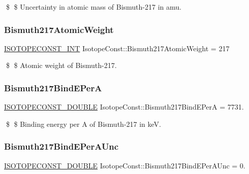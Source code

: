 \$ \$ Uncertainty in atomic mass of Bismuth-\/217 in amu. \mbox{\label{group___isotope_const-_bismuth-_bi217_ga1aa78d8ddf62b6e94b893dd92f1106c9}} 
\subsubsection{\texorpdfstring{Bismuth217\+Atomic\+Weight}{Bismuth217AtomicWeight}}
{\footnotesize\ttfamily \mbox{\hyperlink{group___isotope_const-_macros_ga5f18360b3e99483a35c32d789e62621c}{I\+S\+O\+T\+O\+P\+E\+C\+O\+N\+S\+T\+\_\+\+I\+NT}} Isotope\+Const\+::\+Bismuth217\+Atomic\+Weight = 217}

\$ \$ Atomic weight of Bismuth-\/217. \mbox{\label{group___isotope_const-_bismuth-_bi217_ga7b9d72799d45cb617e8bf26211e88613}} 
\subsubsection{\texorpdfstring{Bismuth217\+Bind\+E\+PerA}{Bismuth217BindEPerA}}
{\footnotesize\ttfamily \mbox{\hyperlink{group___isotope_const-_macros_ga8f45a7272ce02c0b4c65c44636ed719a}{I\+S\+O\+T\+O\+P\+E\+C\+O\+N\+S\+T\+\_\+\+D\+O\+U\+B\+LE}} Isotope\+Const\+::\+Bismuth217\+Bind\+E\+PerA = 7731.}

\$ \$ Binding energy per A of Bismuth-\/217 in keV. \mbox{\label{group___isotope_const-_bismuth-_bi217_gacd401b964c74142d492a10ec005ffb59}} 
\subsubsection{\texorpdfstring{Bismuth217\+Bind\+E\+Per\+A\+Unc}{Bismuth217BindEPerAUnc}}
{\footnotesize\ttfamily \mbox{\hyperlink{group___isotope_const-_macros_ga8f45a7272ce02c0b4c65c44636ed719a}{I\+S\+O\+T\+O\+P\+E\+C\+O\+N\+S\+T\+\_\+\+D\+O\+U\+B\+LE}} Isotope\+Const\+::\+Bismuth217\+Bind\+E\+Per\+A\+Unc = 0.}


